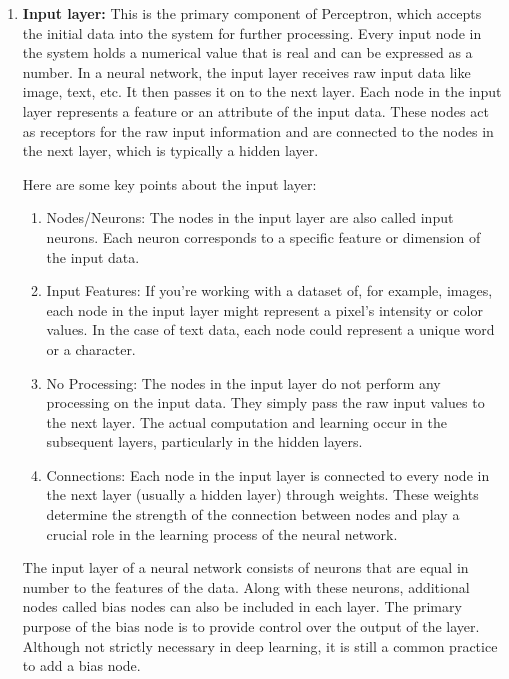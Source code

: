 \begin{enumerate}
    \item \textbf{Input layer: } This is the primary component of Perceptron, which accepts the initial data into the system for further processing. Every input node in the system holds a numerical value that is real and can be expressed as a number.
In a neural network, the input layer receives raw input data like image, text, etc. It then passes it on to the next layer. Each node in the input layer represents a feature or an attribute of the input data. These nodes act as receptors for the raw input information and are connected to the nodes in the next layer, which is typically a hidden layer.
    
Here are some key points about the input layer:
    \begin{enumerate}
\item Nodes/Neurons: The nodes in the input layer are also called input neurons. Each neuron corresponds to a specific feature or dimension of the input data.
\item Input Features: If you're working with a dataset of, for example, images, each node in the input layer might represent a pixel's intensity or color values. In the case of text data, each node could represent a unique word or a character.
\item No Processing: The nodes in the input layer do not perform any processing on the input data. They simply pass the raw input values to the next layer. The actual computation and learning occur in the subsequent layers, particularly in the hidden layers.
\item Connections: Each node in the input layer is connected to every node in the next layer (usually a hidden layer) through weights. These weights determine the strength of the connection between nodes and play a crucial role in the learning process of the neural network.
    \end{enumerate}
    The input layer of a neural network consists of neurons that are equal in number to the features of the data. Along with these neurons, additional nodes called bias nodes can also be included in each layer. The primary purpose of the bias node is to provide control over the output of the layer. Although not strictly necessary in deep learning, it is still a common practice to add a bias node.
    

\end{enumerate}
